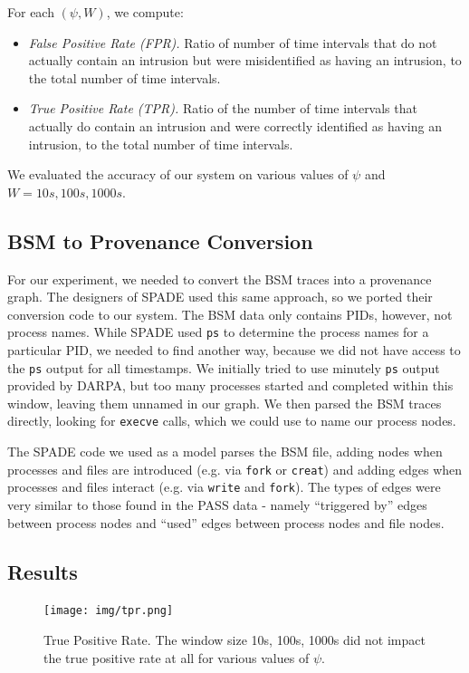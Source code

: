 \documentclass[10pt,twocolumn]{article}
\begin{document}
For each $(\psi, W)$, we compute:
\begin{itemize}
\item {\em False Positive Rate (FPR).} Ratio of number of time intervals that do not actually contain an intrusion
but were misidentified as having an intrusion, to the total number of time intervals.
\item {\em True Positive Rate (TPR).} Ratio of the number of time intervals that actually do contain an intrusion
and were correctly identified as having an intrusion, to the total number of time intervals.
\end{itemize}

We evaluated the accuracy of our system on various values of $\psi$ and $W = 10s, 100s, 1000s$.
\subsection{BSM to Provenance Conversion}
For our experiment, we needed to convert the BSM traces into a provenance graph. The designers of SPADE \cite{spade} used this same approach, so we ported their conversion code to our system. The BSM data only contains PIDs, however, not process names. While SPADE used \texttt{ps} to determine the process names for a particular PID, we needed to find another way, because we did not have access to the \texttt{ps} output for all timestamps. We initially tried to use minutely \texttt{ps} output provided by DARPA, but too many processes started and completed within this window, leaving them unnamed in our graph. We then parsed the BSM traces directly, looking for \texttt{execve} calls, which we could use to name our process nodes. 

The SPADE code we used as a model parses the BSM file, adding nodes when processes and files are introduced (e.g. via \texttt{fork} or \texttt{creat}) and adding edges when processes and files interact (e.g. via \texttt{write} and \texttt{fork}). The types of edges were very similar to those found in the PASS data - namely ``triggered by'' edges between process nodes and ``used'' edges between process nodes and file nodes.
\subsection{Results}

\noindent
\begin{figure}
  \label{tpr}
  \centering
    \texttt{[image: img/tpr.png]}
    \caption{True Positive Rate. The window size 10s, 100s, 1000s did not impact the true positive rate at all for various values of $\psi$.} 
\end{figure}
\end{document}
